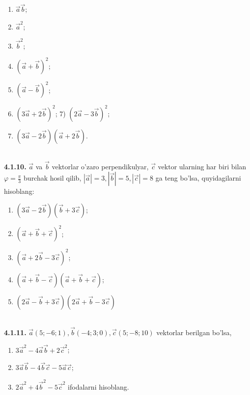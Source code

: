 \documentclass[10pt]{article}
\begin{document}
\begin{enumerate}
  \item $\vec{a} \vec{b}$;
  \item $\vec{a}^{2}$;
  \item $\vec{b}^{2}$;
  \item $(\vec{a}+\vec{b})^{2}$;
  \item $(\vec{a}-\vec{b})^{2}$;
  \item $(3 \vec{a}+2 \vec{b})^{2}$; 7) $(2 \vec{a}-3 \vec{b})^{2}$;
  \item $(3 \vec{a}-2 \vec{b})(\vec{a}+2 \vec{b})$.
\end{enumerate}\\
\textbf{4.1.10.} $\vec{a}$ va $\vec{b}$ vektorlar o'zaro perpendikulyar, $\vec{c}$ vektor ularning har biri bilan $\varphi=\frac{\pi}{3}$ burchak hosil qilib, $|\vec{a}|=3,|\vec{b}|=5,|\vec{c}|=8$ ga teng bo'lsa, quyidagilarni hisoblang:
\begin{enumerate}
  \item $(3 \vec{a}-2 \vec{b})(\vec{b}+3 \vec{c})$;
  \item $(\vec{a}+\vec{b}+\vec{c})^{2}$;
  \item $(\vec{a}+2 \vec{b}-3 \vec{c})^{2}$;
  \item $(\vec{a}+\vec{b}-\vec{c})(\vec{a}+\vec{b}+\vec{c})$;
  \item $(2 \vec{a}-\vec{b}+3 \vec{c})(2 \vec{a}+\vec{b}-3 \vec{c})$
\end{enumerate}\\
\textbf{4.1.11.} $\vec{a}(5 ;-6 ; 1), \vec{b}(-4 ; 3 ; 0), \vec{c}(5 ;-8 ; 10)$ vektorlar berilgan bo'lsa,
\begin{enumerate}
  \item $3 \vec{a}^{2}-4 \vec{a} \vec{b}+2 \vec{c}^{2}$;
  \item $3 \vec{a} \vec{b}-4 \vec{b} \vec{c}-5 \vec{a} \vec{c}$;
  \item $2 \vec{a}^{2}+4 \vec{b}^{2}-5 \vec{c}^{2}$ ifodalarni hisoblang.
\end{enumerate}
\end{document}
